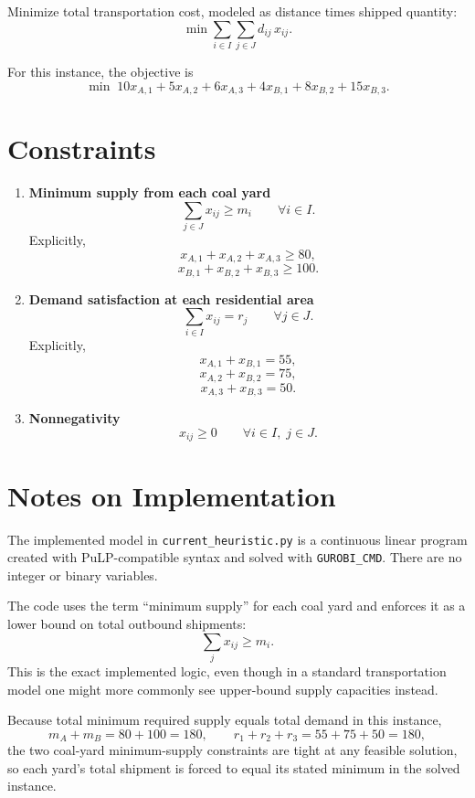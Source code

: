 Minimize total transportation cost, modeled as distance times shipped quantity:
\[
\min \sum_{i\in I}\sum_{j\in J} d_{ij}\,x_{ij}.
\]

For this instance, the objective is
\[
\min\;
10x_{A,1}+5x_{A,2}+6x_{A,3}
+4x_{B,1}+8x_{B,2}+15x_{B,3}.
\]

\section*{Constraints}

\begin{enumerate}
    \item \textbf{Minimum supply from each coal yard}
    \[
    \sum_{j\in J} x_{ij} \ge m_i
    \qquad \forall i\in I.
    \]
    Explicitly,
    \[
    x_{A,1}+x_{A,2}+x_{A,3} \ge 80,
    \]
    \[
    x_{B,1}+x_{B,2}+x_{B,3} \ge 100.
    \]

    \item \textbf{Demand satisfaction at each residential area}
    \[
    \sum_{i\in I} x_{ij} = r_j
    \qquad \forall j\in J.
    \]
    Explicitly,
    \[
    x_{A,1}+x_{B,1}=55,
    \]
    \[
    x_{A,2}+x_{B,2}=75,
    \]
    \[
    x_{A,3}+x_{B,3}=50.
    \]

    \item \textbf{Nonnegativity}
    \[
    x_{ij}\ge 0
    \qquad \forall i\in I,\; j\in J.
    \]
\end{enumerate}

\section*{Notes on Implementation}

The implemented model in \texttt{current\_heuristic.py} is a continuous linear program created with PuLP-compatible syntax and solved with \texttt{GUROBI\_CMD}. There are no integer or binary variables.

The code uses the term ``minimum supply'' for each coal yard and enforces it as a lower bound on total outbound shipments:
\[
\sum_{j} x_{ij} \ge m_i.
\]
This is the exact implemented logic, even though in a standard transportation model one might more commonly see upper-bound supply capacities instead.

Because total minimum required supply equals total demand in this instance,
\[
m_A+m_B = 80+100 = 180,
\qquad
r_1+r_2+r_3 = 55+75+50 = 180,
\]
the two coal-yard minimum-supply constraints are tight at any feasible solution, so each yard's total shipment is forced to equal its stated minimum in the solved instance.
